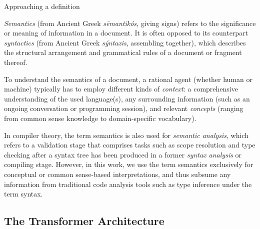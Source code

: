 \begin{genericbox}{Approaching a definition}

	\emph{Semantics} (from Ancient Greek \emph{sēmantikós}, giving signs) refers to the significance or meaning of information in a document.
	It is often opposed to its counterpart \emph{syntactics} (from Ancient Greek \emph{sýntaxis}, assembling together), %
	which describes the structural arrangement and grammatical rules of a document or fragment thereof.

	To understand the semantics of a document, a rational agent (whether human or machine) typically has to employ different kinds of \emph{context}: a comprehensive understanding of the used language(s), any surrounding information (such as an ongoing conversation or programming session), and relevant \emph{concepts} (ranging from common sense knowledge to domain-specific vocabulary).

	In compiler theory, the term semantics is also used for \emph{semantic analysis}, which refers to a validation stage that comprises tasks such as scope resolution and type checking after a syntax tree has been produced in a former \emph{syntax analysis} or compiling stage.
	However, in this work, we use the term semantics exclusively for conceptual or common sense-based interpretations, and thus subsume any information from traditional code analysis tools such as type inference under the term syntax.
\end{genericbox}

\subsection*{The Transformer Architecture}
\label{sec:background/semtec/transformers}

